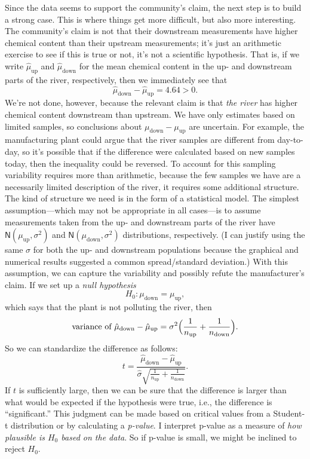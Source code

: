 \documentclass[a4paper, 12pt]{article}
\theoremstyle{plain}
\theoremstyle{definition}
\theoremstyle{remark}
\newcommand{\nm}{\mathsf{N}}
\begin{document}
Since the data seems to support the community's claim, the next step is to build a strong case.  This is where things get more difficult, but also more interesting.  The community's claim is not that {their} downstream measurements have higher chemical content than their upstream measurements; it's just an arithmetic exercise to see if this is true or not, it's not a scientific hypothesis.  That is, if we write $\hat\mu_{\text{up}}$ and $\hat\mu_{\text{down}}$ for the mean chemical content in the up- and downstream parts of the river, respectively, then we immediately see that 
\[ \hat\mu_{\text{down}} - \hat\mu_{\text{up}} = 4.64 > 0. \]
We're not done, however, because the relevant claim is that {\em the river} has higher chemical content downstream than upstream.  We have only estimates based on limited samples, so conclusions about $\mu_{\text{down}} - \mu_{\text{up}}$ are uncertain.  For example, the manufacturing plant could argue that the river samples are different from day-to-day, so it's possible that if the difference were calculated based on new samples today, then the inequality could be reversed.  To account for this sampling variability requires more than arithmetic, because the few samples we have are a necessarily limited description of the river, it requires some additional structure.  The kind of structure we need is in the form of a statistical model.  The simplest assumption---which may not be appropriate in all cases---is to assume measurements taken from the up- and downstream parts of the river have $\nm(\mu_{\text{up}}, \sigma^2)$ and $\nm(\mu_{\text{down}}, \sigma^2)$ distributions, respectively.  (I can justify using the same $\sigma$ for both the up- and downstream populations because the graphical and numerical results suggested a common spread/standard deviation.)  With this assumption, we can capture the variability and possibly refute the manufacturer's claim.  If we set up a {\em null hypothesis} 
\[ H_0: \mu_{\text{down}} = \mu_{\text{up}}, \]
which says that the plant is not polluting the river, then 
\[ \text{variance of $\hat\mu_{\text{down}} - \hat\mu_{\text{up}}$} = \sigma^2 \Bigl(\frac{1}{n_{\text{up}}} + \frac{1}{n_{\text{down}}} \Bigr). \]
So we can standardize the difference as follows:
\[ t = \frac{\hat\mu_{\text{down}} - \hat\mu_{\text{up}}}{\hat\sigma \sqrt{ \frac{1}{n_{\text{up}}} + \frac{1}{n_{\text{down}}} }}. \]
If $t$ is sufficiently large, then we can be sure that the difference is larger than what would be expected if the hypothesis were true, i.e., the difference is ``significant.''  This judgment can be made based on critical values from a Student-t distribution or by calculating a {\em p-value}.  I interpret p-value as a measure of {\em how plausible is $H_0$ based on the data}.  So if p-value is small, we might be inclined to reject $H_0$.  
\end{document}
